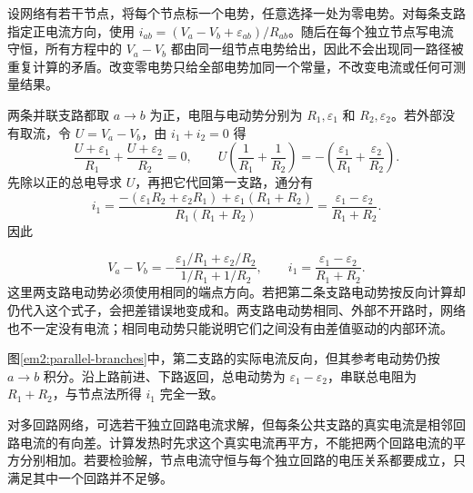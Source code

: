 设网络有若干节点，将每个节点标一个电势，任意选择一处为零电势。对每条支路指定正电流方向，使用 $i_{ab}=(V_a-V_b+\varepsilon_{ab})/R_{ab}$。随后在每个独立节点写电流守恒，所有方程中的 $V_a-V_b$ 都由同一组节点电势给出，因此不会出现同一路径被重复计算的矛盾。改变零电势只给全部电势加同一个常量，不改变电流或任何可测量结果。


两条并联支路都取 $a\to b$ 为正，电阻与电动势分别为 $R_1,\varepsilon_1$ 和 $R_2,\varepsilon_2$。若外部没有取流，令 $U=V_a-V_b$，由 $i_1+i_2=0$ 得
\[
 \frac{U+\varepsilon_1}{R_1}+\frac{U+\varepsilon_2}{R_2}=0,
 \qquad
 U\left(\frac1{R_1}+\frac1{R_2}\right)
 =-\left(\frac{\varepsilon_1}{R_1}+\frac{\varepsilon_2}{R_2}\right).
\]
先除以正的总电导求 $U$，再把它代回第一支路，通分有
\[
 i_1=\frac{-(\varepsilon_1R_2+\varepsilon_2R_1)
              +\varepsilon_1(R_1+R_2)}{R_1(R_1+R_2)}
 =\frac{\varepsilon_1-\varepsilon_2}{R_1+R_2}.
\]
因此

\[V_a-V_b=-\frac{\varepsilon_1/R_1+\varepsilon_2/R_2}{1/R_1+1/R_2},\qquad i_1=\frac{\varepsilon_1-\varepsilon_2}{R_1+R_2}.\]
这里两支路电动势必须使用相同的端点方向。若把第二条支路电动势按反向计算却仍代入这个式子，会把差错误地变成和。两支路电动势相同、外部不开路时，网络也不一定没有电流；相同电动势只能说明它们之间没有由差值驱动的内部环流。


图\ref{em2:parallel-branches}中，第二支路的实际电流反向，但其参考电动势仍按 $a\to b$ 积分。沿上路前进、下路返回，总电动势为 $\varepsilon_1-\varepsilon_2$，串联总电阻为 $R_1+R_2$，与节点法所得 $i_1$ 完全一致。



对多回路网络，可选若干独立回路电流求解，但每条公共支路的真实电流是相邻回路电流的有向差。计算发热时先求这个真实电流再平方，不能把两个回路电流的平方分别相加。若要检验解，节点电流守恒与每个独立回路的电压关系都要成立，只满足其中一个回路并不足够。



